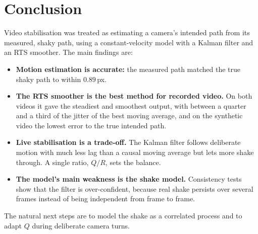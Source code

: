 \documentclass[11pt,a4paper]{article}
\begin{document}
\section{Conclusion}\label{sec:conclusion}
Video stabilisation was treated as estimating a camera's intended path from its measured, shaky
path, using a constant-velocity model with a Kalman filter and an RTS smoother. The main findings
are:
\begin{itemize}
  \item \textbf{Motion estimation is accurate:} the measured path matched the true shaky path to
        within $0.89$\,px.
  \item \textbf{The RTS smoother is the best method for recorded video.} On both videos it gave
        the steadiest and smoothest output, with between a quarter and a third of the jitter of
        the best moving average, and on the synthetic video the lowest error to the true intended
        path.
  \item \textbf{Live stabilisation is a trade-off.} The Kalman filter follows deliberate motion
        with much less lag than a causal moving average but lets more shake through. A single
        ratio, $Q/R$, sets the balance.
  \item \textbf{The model's main weakness is the shake model.} Consistency tests show that the
        filter is over-confident, because real shake persists over several frames instead of
        being independent from frame to frame.
\end{itemize}
The natural next steps are to model the shake as a correlated process and to adapt $Q$ during
deliberate camera turns.
\end{document}
